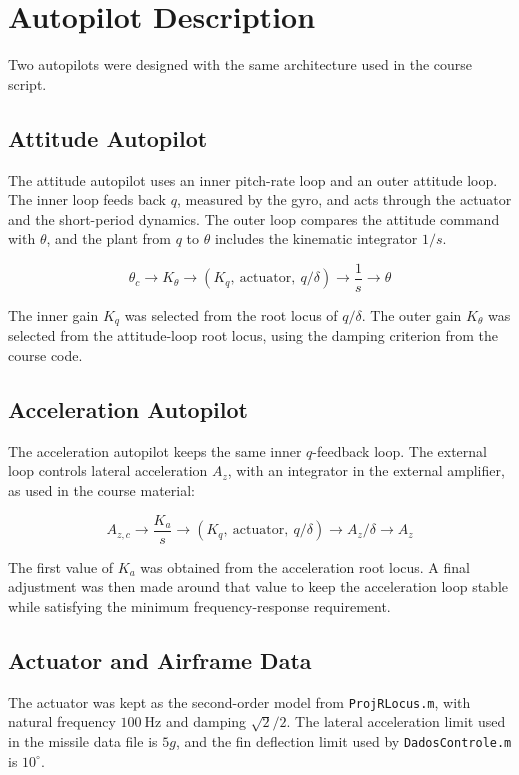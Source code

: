 \section{Autopilot Description}

Two autopilots were designed with the same architecture used in the course script.

\subsection{Attitude Autopilot}

The attitude autopilot uses an inner pitch-rate loop and an outer attitude loop. The inner loop feeds back \(q\), measured by the gyro, and acts through the actuator and the short-period dynamics. The outer loop compares the attitude command with \(\theta\), and the plant from \(q\) to \(\theta\) includes the kinematic integrator \(1/s\).

\[
    \theta_c \rightarrow K_\theta \rightarrow
    \left(K_q,~\text{actuator},~q/\delta\right)
    \rightarrow \frac{1}{s} \rightarrow \theta
\]

The inner gain \(K_q\) was selected from the root locus of \(q/\delta\). The outer gain \(K_\theta\) was selected from the attitude-loop root locus, using the damping criterion from the course code.

\subsection{Acceleration Autopilot}

The acceleration autopilot keeps the same inner \(q\)-feedback loop. The external loop controls lateral acceleration \(A_z\), with an integrator in the external amplifier, as used in the course material:

\[
    A_{z,c} \rightarrow \frac{K_a}{s} \rightarrow
    \left(K_q,~\text{actuator},~q/\delta\right)
    \rightarrow A_z/\delta \rightarrow A_z
\]

The first value of \(K_a\) was obtained from the acceleration root locus. A final adjustment was then made around that value to keep the acceleration loop stable while satisfying the minimum frequency-response requirement.

\subsection{Actuator and Airframe Data}

The actuator was kept as the second-order model from \texttt{ProjRLocus.m}, with natural frequency \(100~\text{Hz}\) and damping \(\sqrt{2}/2\). The lateral acceleration limit used in the missile data file is \(5g\), and the fin deflection limit used by \texttt{DadosControle.m} is \(10^\circ\).
